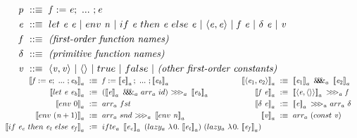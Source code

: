 \documentclass{llncs}
\newcommand{\smallmathfont}{\fontsize{7.5}{9}\selectfont}
\newcommand{\acomp}{\ensuremath{{>}\mspace{-6mu}{>}\mspace{-6mu}{>}}}
\newcommand{\apair}{\ensuremath{\mathit{\&\mspace{-7.5mu}\&\mspace{-7.5mu}\&}}}
\newcommand{\gen}{_a}
\begin{document}
\begin{figure}[!tb]\centering
\smallmathfont
\begin{align*}
	\mathit{p} &\ ::\equiv \ \mathit{f := e};\ ...\ ; \mathit{e}
\\
	\mathit{e} &\ ::\equiv \ let~\mathit{e~e}\ |\ env~\mathit{n}\ |\ if~\mathit{e}~then~\mathit{e}~else~\mathit{e}\ |\ \mathit{\pair{e,e}}\ |\ \mathit{f~e}\ |\ \mathit{\delta~e}\ |\ \mathit{v}\
\\
	\mathit{f} &\ ::\equiv \ \textit{(first-order function names)}
\\
	\delta &\ ::\equiv \ \textit{(primitive function names)}
\\
	\mathit{v} &\ ::\equiv \ \pair{\mathit{v},\mathit{v}}\ |\ \pair{}\ |\ true\ |\ false\ |\ \textit{(other first-order constants)}
\\[-6pt]
\end{align*}
\begin{align*}
\begin{aligned}[t]
	\meaningof{\mathit{f} := \mathit{e};\ ...\ ; \mathit{e_b}}\gen &\ :\equiv\
		\mathit{f} := \meaningof{\mathit{e}}\gen;\ ...\ ; \meaningof{\mathit{e_b}}\gen
\\
	\meaningof{let~\mathit{e}~\mathit{e_b}}\gen &\ :\equiv\ 
		(\meaningof{\mathit{e}}\gen~\apair\gen~arr\gen~id)~
			\acomp\gen~
		\meaningof{\mathit{e_b}}\gen
\\
	\meaningof{env~0}\gen &\ :\equiv\ arr\gen~fst
\\
	\meaningof{env~(\mathit{n}+1)}\gen &\ :\equiv\ arr\gen~snd~\acomp\gen~\meaningof{env~\mathit{n}}\gen
\\
	\meaningof{if~\mathit{e_c}~then~\mathit{e_t}~else~\mathit{e_f}}\gen &\ :\equiv\
		ifte\gen~
			\meaningof{\mathit{e_c}}\gen~
			(lazy\gen~\fun{0}{\meaningof{\mathit{e_t}}\gen})~
			(lazy\gen~\fun{0}{\meaningof{\mathit{e_f}}\gen})\hspace{-3in}
\end{aligned}
&\tab\tab\tab\tab\ 
\begin{aligned}[t]
	\meaningof{\pair{\mathit{e}_1,\mathit{e}_2}}\gen &\ :\equiv\
		\meaningof{\mathit{e}_1}\gen~\apair\gen~\meaningof{\mathit{e}_2}\gen
\\
	\meaningof{\mathit{f}~\mathit{e}}\gen &\ :\equiv\
		\meaningof{\pair{\mathit{e},\pair{}}}\gen~\acomp\gen~\mathit{f}
\\
	\meaningof{\delta~\mathit{e}}\gen &\ :\equiv\
		\meaningof{\mathit{e}}\gen~\acomp\gen~arr\gen~\delta
\\
	\meaningof{\mathit{v}}\gen &\ :\equiv\ arr\gen~(const~\mathit{v})

\end{aligned}
\end{align*}
\end{figure}
\end{document}
